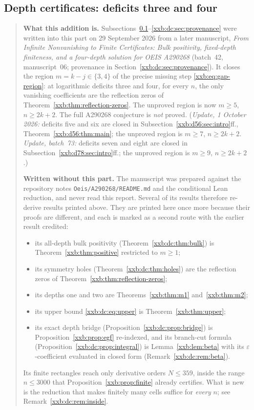 \documentclass[11pt,a4paper]{article}
\numberwithin{equation}{section}
\theoremstyle{definition}
\theoremstyle{remark}
\theoremstyle{plain}
\begin{document}
\subsection{Depth certificates: deficits three and four}\label{xxb:dc:sec:intro}

\begin{quote}\small
\textbf{What this addition is.}  Subsections~\ref{xxb:dc:sec:intro}--\ref{xxb:dc:sec:provenance}
were written into this part on 29 September 2026 from a later manuscript,
\emph{From Infinite Nonvanishing to Finite Certificates: Bulk positivity,
fixed-depth finiteness, and a four-depth solution for OEIS A290268}
(batch~42, manuscript~06; provenance in
Section~\ref{xxb:dc:sec:provenance}).  It closes the region
$m=k-j\in\{3,4\}$ of the precise missing step \eqref{xxb:eq:gap-region}:
at logarithmic deficits three and four, for every $n$, the only vanishing
coefficients are the reflection zeros of
Theorem~\ref{xxb:thm:reflection-zeros}.  The unproved region is now
$m\ge5$, $n\ge2k+2$.  The full A290268 conjecture is \emph{not} proved.
(\emph{Update, 1 October 2026:} deficits five and six are closed in
Subsection~\ref{xxb:d56:sec:intro}ff., Theorem~\ref{xxb:d56:thm:main}; the
unproved region is $m\ge7$, $n\ge2k+2$.  \emph{Update, batch~73:} deficits
seven and eight are closed in Subsection~\ref{xxb:d78:sec:intro}ff.; the
unproved region is $m\ge9$, $n\ge2k+2$.)

\smallskip
\textbf{Written without this part.}  The manuscript was prepared against the
repository notes \texttt{Oeis/A290268/README.md} and the conditional Lean
reduction, and never read this report.  Several of its results therefore
re-derive results printed above.  They are printed here once more because
their proofs are different, and each is marked as a second route with the
earlier result credited:
\begin{itemize}[leftmargin=1.4em,itemsep=1pt]
\item its all-depth bulk positivity (Theorem~\ref{xxb:dc:thm:bulk}) is
 Theorem~\ref{xxb:thm:positive} restricted to $m\ge1$;
\item its symmetry holes (Theorem~\ref{xxb:dc:thm:holes}) are the reflection
 zeros of Theorem~\ref{xxb:thm:reflection-zeros};
\item its depths one and two are Theorems~\ref{xxb:thm:m1}
 and~\ref{xxb:thm:m2};
\item its upper bound \eqref{xxb:dc:eq:upper} is Theorem~\ref{xxb:thm:upper};
\item its exact depth bridge (Proposition~\ref{xxb:dc:prop:bridge}) is
 Proposition~\ref{xxb:prop:egf} re-indexed, and its branch-cut formula
 (Proposition~\ref{xxb:dc:prop:integral}) is Lemma~\ref{xxb:lem:beta} with its
 $\varepsilon$-coefficient evaluated in closed form
 (Remark~\ref{xxb:dc:rem:beta}).
\end{itemize}
Its finite rectangles reach only derivative orders $N\le359$, inside the range
$n\le3000$ that Proposition~\ref{xxb:prop:finite} already certifies.  What is
new is the reduction that makes finitely many cells suffice for \emph{every}
$n$; see Remark~\ref{xxb:dc:rem:inside}.


\end{quote}
\end{document}
